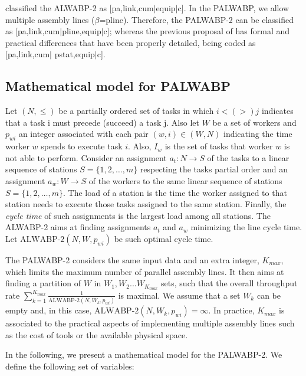 \documentclass{singlecol-new}
\begin{document}
\cite{boysen07classification} classified the ALWABP-2 as [pa,link,cum$\vert$equip$\vert$c]. In the PALWABP, we allow multiple assembly lines ($\beta$=pline). Therefore, the PALWABP-2 can be classified as [pa,link,cum$\vert$pline,equip$\vert$c]; whereas the previous proposal of \cite{araujo12two} has formal and practical differences that have been properly detailed, being coded as [pa,link,cum$\vert$ pstat,equip$\vert$c].

\subsection{Mathematical model for PALWABP}

Let $(N,\leq)$ be a partially ordered set of tasks in which $i< (>) j$ indicates that a task i must precede (succeed) a task j.  Also let $W$ be a set of workers and $p_{wi}$ an integer associated with each pair $(w,i) \in (W,N)$ indicating the time worker $w$ spends to execute task $i$. Also, $I_w$ is the set of tasks that worker $w$ is not able to perform. Consider an assignment  $a_t:N\rightarrow S$ of the tasks to a linear sequence of stations $S=\{1,2,\ldots,m\}$ respecting the tasks partial order and an assignment $a_w:W\rightarrow S$ of the workers to the same linear sequence of stations $S=\{1,2,\ldots,m\}$. The load of a station is the time the worker assigned to that station needs to execute those tasks assigned to the same station. Finally, the \emph{cycle time} of such  assignments is the largest load among all stations. The ALWABP-2 aims at finding assignments $a_t$ and $a_w$ minimizing the line cycle time. Let $\textrm{ALWABP-2}(N,W,p_{wi})$ be such optimal cycle time.
 
The PALWABP-2 considers the same input data and an extra integer, $K_{max}$, which limits the maximum number of parallel assembly lines. It then aims at finding a partition of $W$ in  $W_1, W_2... W_{K_{max}}$ sets, such that the overall throughput rate $\sum_{k=1}^{K_{max}} \frac{1}{\textrm{ALWABP-2}(N,W_k, p_{wi})}$ is maximal. We assume that a set $W_k$ can be empty and, in this case, $\textrm{ALWABP-2}(N,W_k, p_{wi}) = \infty$. In practice, $K_{max}$ is associated to the practical aspects of implementing multiple assembly lines such as the cost of tools or the available physical space.

In the following, we present a mathematical model for the PALWABP-2.  We define the following set of variables:

\vspace{0.2cm}
\end{document}
